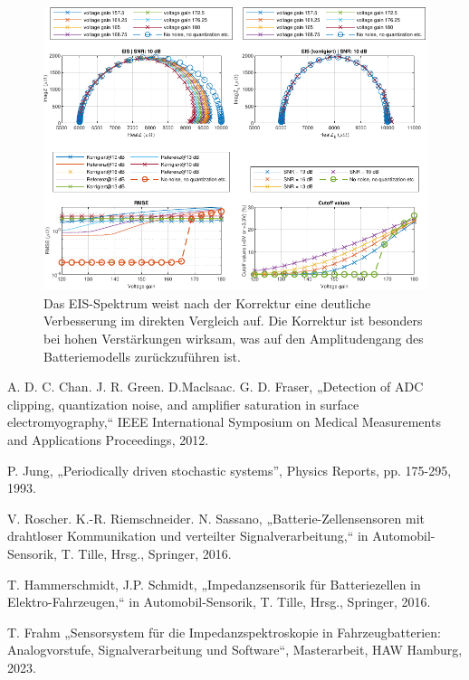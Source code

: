 \begin{figure}[bh!]
	\centering
	\includegraphics[width=.99\textwidth]{../img/ergebnisse.pdf}
	\caption{Das EIS-Spektrum weist nach der Korrektur eine deutliche Verbesserung im direkten Vergleich auf. Die Korrektur ist besonders bei hohen Verstärkungen wirksam, was auf den Amplitudengang des Batteriemodells zurückzuführen ist.}
	\label{fig:Ergebnisse} 
\end{figure}

   

\begin{thebibliography}{[99]}
	A. D. C. Chan. J. R. Green. D.Maclsaac. G. D. Fraser, „Detection of ADC clipping, quantization noise, and amplifier saturation in surface electromyography,“ IEEE International Symposium on Medical Measurements and Applications Proceedings, 2012.
	
	P. Jung, „Periodically driven stochastic systems”, Physics Reports,  pp. 175-295, 1993.
	
	V. Roscher. K.-R. Riemschneider. N. Sassano, „Batterie-Zellensensoren mit drahtloser Kommunikation und verteilter Signalverarbeitung,“ in Automobil-Sensorik, T. Tille, Hrsg., Springer, 2016.
	
	T. Hammerschmidt, J.P. Schmidt, „Impedanzsensorik für Batteriezellen in Elektro-Fahrzeugen,“ in Automobil-Sensorik, T. Tille, Hrsg., Springer, 2016.
	
	T. Frahm „Sensorsystem für die Impedanzspektroskopie in Fahrzeugbatterien: Analogvorstufe, Signalverarbeitung und Software“, Masterarbeit, HAW Hamburg, 2023.
	
\end{thebibliography}
	

 
 